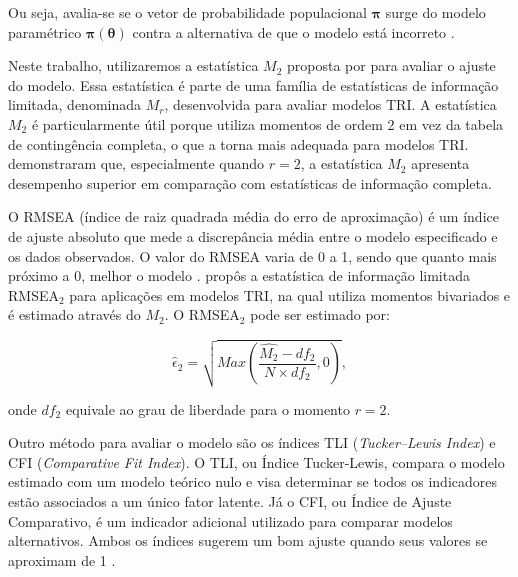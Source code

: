 Ou seja, avalia-se se o vetor de probabilidade populacional $\boldsymbol{\pi}$ surge do modelo paramétrico $\boldsymbol{\pi}(\boldsymbol{\theta})$ contra a alternativa de que o modelo está incorreto \cite{maydeu2006limited}.

Neste trabalho, utilizaremos a estatística $M_2$ proposta por  para avaliar o ajuste do modelo. Essa estatística é parte de uma família de estatísticas de informação limitada, denominada $M_r$, desenvolvida para avaliar modelos TRI. A estatística $M_2$ é particularmente útil porque utiliza momentos de ordem 2 em vez da tabela de contingência completa, o que a torna mais adequada para modelos TRI.  demonstraram que, especialmente quando $r=2$, a estatística $M_2$ apresenta desempenho superior em comparação com estatísticas de informação completa. 



O RMSEA (índice de raiz quadrada média do erro de aproximação) é um índice de ajuste absoluto que mede a discrepância média entre o modelo especificado e os dados observados. O valor do RMSEA varia de 0 a 1, sendo que quanto mais próximo a 0, melhor o modelo \cite{kline2016principles}.  propôs a estatística de informação limitada RMSEA$_{2}$ para aplicações em modelos TRI, na qual utiliza momentos bivariados e é estimado através do $M_2$. O RMSEA$_2$ pode ser estimado por:

\[
	\hat{\epsilon}_2 = \sqrt{Max\left(\frac{\hat{M_{2}} - df_{2}}
		{N \times df_{2}}, 0 \right) } ,
\]

\noindent onde $df_2$ equivale ao grau de liberdade para o momento $r = 2$.



\begin{comment}
	Outro método método para avaliar o modelo são os índices TLI  (\textit{Tucker–Lewis Index}) e CFI (\textit{Comparative Fit Index}), TLI significa Índice Tucker-Lewis e CFI significa Índice de Ajuste Comparativo. O TLI  compara o modelo estimado com um modelo teórico nulo e visa determinar se todos os indicadores são
	associados a um único fator latente, o CFI é um indicador adicional que serve para comparar modelos alternativos \cite{boruchovitch2017dark}. Ambos os indicadores indicam modelos com bom ajustes quando seu valor próximos de 1 \cite{hair2009multivariada}). 
\end{comment}


Outro método para avaliar o modelo são os índices TLI (\textit{Tucker–Lewis Index}) e CFI (\textit{Comparative Fit Index}). O TLI, ou Índice Tucker-Lewis, compara o modelo estimado com um modelo teórico nulo e visa determinar se todos os indicadores estão associados a um único fator latente. Já o CFI, ou Índice de Ajuste Comparativo, é um indicador adicional utilizado para comparar modelos alternativos. Ambos os índices sugerem um bom ajuste quando seus valores se aproximam de 1 \cite{hair2009multivariada}.


